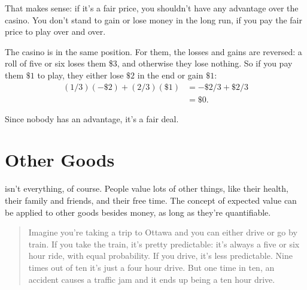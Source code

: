 \documentclass[justified]{tufte-book}
\newenvironment{problem}{\begin{quote}\normalsize}{\end{quote}}
\theoremstyle{definition}
\theoremstyle{definition}
\theoremstyle{definition}
\theoremstyle{remark}
\begin{document}
That makes sense: if it's a fair price, you shouldn't have any advantage over the casino. You don't stand to gain or lose money in the long run, if you pay the fair price to play over and over.

The casino is in the same position. For them, the losses and gains are reversed: a roll of five or six loses them \$3, and otherwise they lose nothing. So if you pay them \(\$1\) to play, they either lose \(\$2\) in the end or gain \(\$1\):
\[
  \begin{aligned}
    (1/3)(-\$2) + (2/3)(\$1) &= -\$2/3 + \$2/3\\
      &= \$0.
  \end{aligned}
\]

Since nobody has an advantage, it's a fair deal.

\hypertarget{other-goods}{%
\section{Other Goods}\label{other-goods}}

 isn't everything, of course. People value lots of other things, like their health, their family and friends, and their free time. The concept of expected value can be applied to other goods besides money, as long as they're quantifiable.

\begin{problem}
Imagine you're taking a trip to Ottawa and you can either drive or go by
train. If you take the train, it's pretty predictable: it's always a
five or six hour ride, with equal probability. If you drive, it's less
predictable. Nine times out of ten it's just a four hour drive. But one
time in ten, an accident causes a traffic jam and it ends up being a ten
hour drive.
\end{problem}
\end{document}
